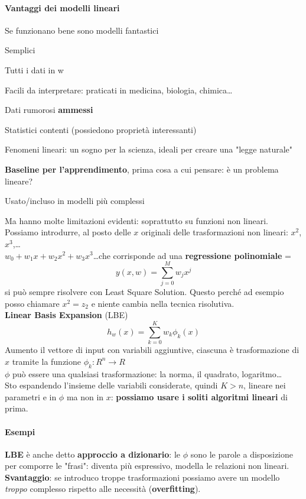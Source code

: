 \documentclass[10pt]{book}
\begin{document}
\paragraph{Vantaggi dei modelli lineari} Se funzionano bene sono modelli fantastici
\begin{list}{}{}
	\item Semplici
	\item Tutti i dati in w
	\item Facili da interpretare: praticati in medicina, biologia, chimica\ldots
	\item Dati rumorosi \textbf{ammessi}
	\item Statistici contenti (possiedono proprietà interessanti)
	\item Fenomeni lineari: un sogno per la scienza, ideali per creare una "legge naturale"
	\item \textbf{Baseline per l'apprendimento}, prima cosa a cui pensare: è un problema lineare?
	\item Usato/incluso in modelli più complessi
\end{list}
Ma hanno molte limitazioni evidenti: soprattutto su funzioni non lineari.\\
Possiamo introdurre, al posto delle $x$ originali delle trasformazioni non lineari: $x^2$, $x^3$,\ldots\\
$w_0 + w_1 x + w_2 x^2 + w_3 x^3$\ldots che corrisponde ad una \textbf{regressione polinomiale} = $$y(x, w) = \sum_{j=0}^M w_j x^j$$ si può sempre risolvere con Least Square Solution. Questo perché ad esempio posso chiamare $x^2 = z_2$ e niente cambia nella tecnica risolutiva.\\
\textbf{Linear Basis Expansion} (LBE)
$$h_w(x) = \sum_{k=0}^K w_k \phi_k (x)$$
Aumento il vettore di input con variabili aggiuntive, ciascuna è trasformazione di $x$ tramite la funzione $\phi_k : R^n \rightarrow R$\\
$\phi$ può essere una qualsiasi trasformazione: la norma, il quadrato, logaritmo\ldots\\
Sto espandendo l'insieme delle variabili considerate, quindi $K > n$, lineare nei parametri e in $\phi$ ma non in $x$: \textbf{possiamo usare i soliti algoritmi lineari} di prima.
\paragraph{Esempi}
\textbf{LBE} è anche detto \textbf{approccio a dizionario}: le $\phi$ sono le parole a disposizione per comporre le "frasi": diventa più espressivo, modella le relazioni non lineari.\\
\textbf{Svantaggio}: se introduco troppe trasformazioni possiamo avere un modello \textit{troppo} complesso rispetto alle necessità (\textbf{overfitting}).
\end{document}
